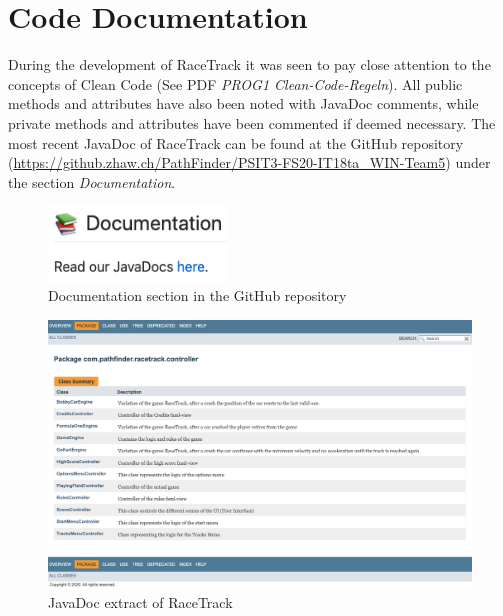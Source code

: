 \section{Code Documentation}
	During the development of RaceTrack it was seen to pay close attention to the concepts of Clean Code (See PDF \textit{PROG1 Clean-Code-Regeln}). All public methods and attributes have also been noted with JavaDoc comments, while private methods and attributes have been commented if deemed necessary.
	The most recent JavaDoc of RaceTrack can be found at the GitHub repository (\url{https://github.zhaw.ch/PathFinder/PSIT3-FS20-IT18ta_WIN-Team5}) under the section \textit{Documentation}.
	\begin{figure}[H]
		\centering
		\includegraphics[height=2cm,keepaspectratio,center]{img/Implementation_Code-Documentation_Documentation-Section.png}
		\caption{Documentation section in the GitHub repository}
	\end{figure}
	\begin{figure}[H]
		\centering
		\includegraphics[width=16cm,keepaspectratio,center]{img/Implementation_Code-Documentation_JavaDoc-Example.png}
		\caption{JavaDoc extract of RaceTrack}
	\end{figure}